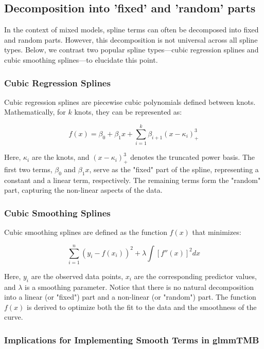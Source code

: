 \documentclass[12pt, twoside,hidelinks]{article}
\theoremstyle{definition}
\numberwithin{equation}{section}
\begin{document}
\subsection{Decomposition into 'fixed' and 'random' parts}

In the context of mixed models, spline terms can often be decomposed into fixed and random parts. However, this decomposition is not universal across all spline types. Below, we contrast two popular spline types—cubic regression splines and cubic smoothing splines—to elucidate this point.

\subsubsection{Cubic Regression Splines}

Cubic regression splines are piecewise cubic polynomials defined between knots. Mathematically, for \(k\) knots, they can be represented as:

\[
f(x) = \beta_0 + \beta_1 x + \sum_{i=1}^{k} \beta_{i+1} (x - \kappa_i)^3_+ 
\]

Here, \(\kappa_i\) are the knots, and \((x - \kappa_i)^3_+\) denotes the truncated power basis. The first two terms, \(\beta_0\) and \(\beta_1 x\), serve as the "fixed" part of the spline, representing a constant and a linear term, respectively. The remaining terms form the "random" part, capturing the non-linear aspects of the data.

\subsubsection{Cubic Smoothing Splines}

Cubic smoothing splines are defined as the function \(f(x)\) that minimizes:

\[
\sum_{i=1}^{n} (y_i - f(x_i))^2 + \lambda \int [f''(x)]^2 dx
\]

Here, \(y_i\) are the observed data points, \(x_i\) are the corresponding predictor values, and \(\lambda\) is a smoothing parameter. Notice that there is no natural decomposition into a linear (or "fixed") part and a non-linear (or "random") part. The function \(f(x)\) is derived to optimize both the fit to the data and the smoothness of the curve.

\subsubsection{Implications for Implementing Smooth Terms in glmmTMB}
\end{document}
